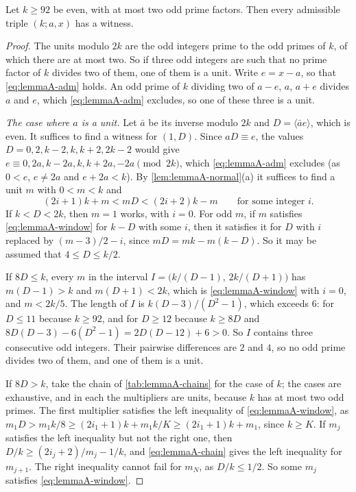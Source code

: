 \begin{proposition}
\label{prop:lemmaA-twoprime}
Let $k\ge92$ be even, with at most two odd prime factors. Then every
admissible triple $(k;a,x)$ has a witness.
\end{proposition}

\begin{proof}
The units modulo $2k$ are the odd integers prime to the odd primes of $k$, of
which there are at most two. So if three odd integers are such that no prime
factor of $k$ divides two of them, one of them is a unit. Write $e=x-a$, so
that \eqref{eq:lemmaA-adm} holds. An odd prime of $k$ dividing two of $a-e$,
$a$, $a+e$ divides $a$ and $e$, which \eqref{eq:lemmaA-adm} excludes, so one of
these three is a unit.

\emph{The case where $a$ is a unit.} Let $\bar a$ be its inverse modulo $2k$
and $D=\langle\bar ae\rangle$, which is even. It suffices to find a witness for
$(1,D)$. Since $aD\equiv e$, the values $D=0,2,k-2,k,k+2,2k-2$ would give
$e\equiv0,2a,k-2a,k,k+2a,-2a\pmod{2k}$, which \eqref{eq:lemmaA-adm} excludes
(as $0<e$, $e\ne2a$ and $e+2a<k$). By \autoref{lem:lemmaA-normal}(a) it
suffices to find a unit $m$ with $0<m<k$ and
\begin{equation}
(2i+1)k+m<mD<(2i+2)k-m\qquad\text{for some integer } i .
\label{eq:lemmaA-window}
\end{equation}
If $k<D<2k$, then $m=1$ works, with $i=0$. For odd $m$, if $m$ satisfies
\eqref{eq:lemmaA-window} for $k-D$ with some $i$, then it satisfies it for $D$
with $i$ replaced by $(m-3)/2-i$, since $mD=mk-m(k-D)$. So it may be assumed
that $4\le D\le k/2$.

If $8D\le k$, every $m$ in the interval $I=\bigl(k/(D-1),\,2k/(D+1)\bigr)$
has $m(D-1)>k$ and $m(D+1)<2k$, which is \eqref{eq:lemmaA-window} with $i=0$,
and $m<2k/5$. The length of $I$ is $k(D-3)/(D^2-1)$, which exceeds $6$: for
$D\le11$ because $k\ge92$, and for $D\ge12$ because $k\ge8D$ and
$8D(D-3)-6(D^2-1)=2D(D-12)+6>0$. So $I$ contains three consecutive odd
integers. Their pairwise differences are $2$ and $4$, so no odd prime divides
two of them, and one of them is a unit.

If $8D>k$, take the chain of \autoref{tab:lemmaA-chains} for the case of $k$;
the cases are exhaustive, and in each the multipliers are units, because $k$
has at most two odd primes. The first multiplier satisfies the left inequality
of \eqref{eq:lemmaA-window}, as $m_1D>m_1k/8\ge(2i_1+1)k+m_1k/K\ge(2i_1+1)k+m_1$,
since $k\ge K$. If $m_j$
satisfies the left inequality but not the right one, then
$D/k\ge(2i_j+2)/m_j-1/k$, and \eqref{eq:lemmaA-chain} gives the left
inequality for $m_{j+1}$. The right inequality cannot fail for $m_N$, as
$D/k\le1/2$. So some $m_j$ satisfies \eqref{eq:lemmaA-window}.


\end{proof}
